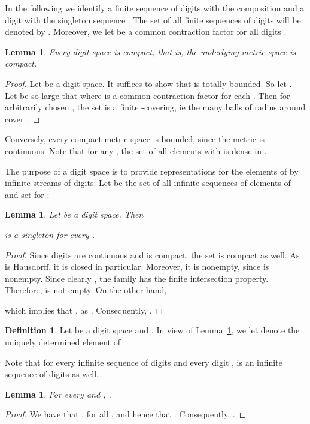 \documentclass[microtype]{jloganal}
\theoremstyle{plain}
\newtheorem{lemma}[theorem]{Lemma}
\theoremstyle{definition}
\newtheorem{definition}[theorem]{Definition}
\begin{document}
In the following we identify a finite sequence of digits 
 with the composition
 and a digit  with the singleton sequence . The set of all finite sequences of digits will be denoted by .
Moreover, we let  be a common contraction factor for all digits .

\begin{lemma}
\label{lem-digit-compact}
Every digit space is compact, that is, the underlying metric space is
compact.
\end{lemma}
\begin{proof}
Let  be a digit space. 
It suffices to show that  is totally bounded. So let .
Let  be so large that  where  is a common
contraction factor for each . Then for 
arbitrarily chosen , the set  
is a finite -covering, ie the  many balls  of radius  around  cover . 
\end{proof}
Conversely, every compact metric space is bounded, since the metric is continuous. Note that for any , the set of all elements  with  is dense in .

The purpose of a digit space is to provide representations for the
elements of  by infinite streams of digits. 
Let  be the set of all infinite sequences of elements of  
and set for  :
 
\begin{lemma}
\label{lem-digit-stream}
Let  be a digit space. Then

is a singleton for every . 
\end{lemma}
\begin{proof}
Since digits are continuous and  is compact, the set  
is compact as well. As  is Hausdorff, it is closed in particular. 
Moreover, it is nonempty, since  is nonempty. 
Since clearly ,
the family  has the finite 
intersection property. 
Therefore,  is not empty. 
On the other hand, 

which implies that 
, 
as . 
Consequently, . 
\end{proof}
\begin{definition}
\label{def-digit-stream-value}
Let  be a digit space and .
In view of Lemma~\ref{lem-digit-stream}, we let  
denote the uniquely determined element of 
.
\end{definition}

Note that for every infinite sequence  of digits and every digit ,  is an infinite sequence of digits as well.

\begin{lemma}\label{lem-valrec}
For every  and , .
\end{lemma}
\begin{proof}
We have that , for all , and hence that . Consequently, .
\end{proof}
\end{document}
